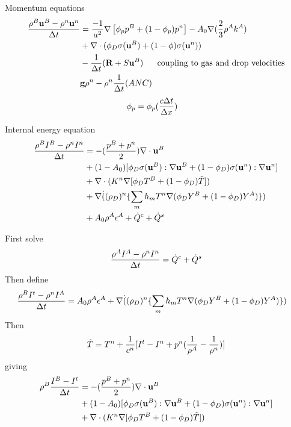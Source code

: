 \documentclass[10pt]{article}
\begin{document}
Momentum equations
\begin{align*}
  {\rho^B {\bf u}^B - \rho^n{\bf u}^n \over {\Delta t}} &= {-1\over a^2} \nabla\left[ \phi_p p^B + (1-\phi_p)p^n\right]
       -A_0 \nabla( {2\over 3} \rho^A k^A ) \\
     & + \nabla\cdot( \phi_D {\bf\sigma}({\bf u}^B) + (1-\phi){\bf\sigma}({\bf u}^n) ) \\
     & - {1\over {\Delta t}} ( {\bf R} + S {\bf u}^B ) ~~~~~\mbox{coupling to gas and drop velocities}\\
     & {\bf g} \rho^n - \rho^n {1 \over {\Delta t}} (ANC)
\end{align*}
\begin{align*}
   \phi_p & = \phi_p( {c{\Delta t}\over{\Delta x}} )
\end{align*}

Internal energy equation
\begin{align*}
  {\rho^B I^B - \rho^n I^n \over {\Delta t}} &= - ({p^B+p^n \over 2})\nabla\cdot{\bf u}^B  \\
          & + (1-A_0)[ \phi_D {\bf\sigma}({\bf u}^B):\nabla{\bf u}^B + (1-\phi_D) {\bf\sigma}({\bf u}^n):\nabla{\bf u}^n] \\
          & +\nabla\cdot( K^n \nabla[ \phi_D T^B + (1-\phi_D) \tilde{T} ] ) \\
          & +\nabla\dot( (\rho_D)^n \{ \sum_m h_m T^n \nabla( \phi_D Y^B + (1-\phi_D)Y^A ) \} ) \\
          & + A_0 \rho^A \epsilon^A + \dot{Q}^c + \dot{Q}^s 
\end{align*}

First solve
\[
   {\rho^A I^A - \rho^n I^n \over {\Delta t} } = \dot{Q}^c + \dot{Q}^s 
\]
Then define
\begin{align*}
  {\rho^B I^t - \rho^n I^A \over {\Delta t}} &= 
               A_0 \rho^A \epsilon^A  +\nabla\dot( (\rho_D)^n \{ \sum_m h_m T^n \nabla( \phi_D Y^B + (1-\phi_D)Y^A ) \} )
\end{align*}
Then 
\[
  \tilde{T} = T^n + {1\over c^n}[ I^t - I^n + p^n( {1\over \rho^A} - {1\over \rho^n} ) ]
\]
giving
\begin{align*}
\rho^B { I^B - I^t \over {\Delta t}} &= - ({p^B+p^n \over 2})\nabla\cdot{\bf u}^B \\
          & + (1-A_0)[ \phi_D {\bf\sigma}({\bf u}^B):\nabla{\bf u}^B + (1-\phi_D) {\bf\sigma}({\bf u}^n):\nabla{\bf u}^n] \\
  & +\nabla\cdot( K^n \nabla[ \phi_D T^B + (1-\phi_D) \tilde{T} ] )
\end{align*}
\end{document}
